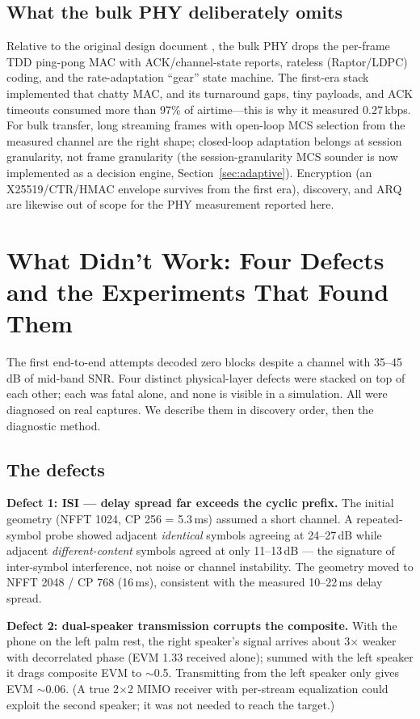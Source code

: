 \documentclass[11pt]{article}
\begin{document}
\subsection{What the bulk PHY deliberately omits}

Relative to the original design document \cite{prd}, the bulk PHY drops the
per-frame TDD ping-pong MAC with ACK/channel-state reports, rateless
(Raptor/LDPC) coding, and the rate-adaptation ``gear'' state machine. The
first-era stack implemented that chatty MAC, and its turnaround gaps, tiny
payloads, and ACK timeouts consumed more than 97\% of airtime---this is why it
measured 0.27\,kbps. For bulk transfer, long streaming frames with open-loop
MCS selection from the measured channel are the right shape; closed-loop
adaptation belongs at session granularity, not frame granularity (the
session-granularity MCS sounder is now implemented as a decision engine,
Section~\ref{sec:adaptive}). Encryption
(an X25519/CTR/HMAC envelope survives from the first era), discovery, and
ARQ are likewise out of scope for the PHY measurement reported here.

\section{What Didn't Work: Four Defects and the Experiments That Found Them}
\label{sec:defects}

The first end-to-end attempts decoded zero blocks despite a channel with
35--45\,dB of mid-band SNR. Four distinct physical-layer defects were stacked
on top of each other; each was fatal alone, and none is visible in a
simulation. All were diagnosed on real captures. We describe them in
discovery order, then the diagnostic method.

\subsection{The defects}

\textbf{Defect 1: ISI --- delay spread far exceeds the cyclic prefix.}
The initial geometry (NFFT 1024, CP 256 = 5.3\,ms) assumed a short channel.
A repeated-symbol probe showed adjacent \emph{identical} symbols agreeing at
24--27\,dB while adjacent \emph{different-content} symbols agreed at only
11--13\,dB --- the signature of inter-symbol interference, not noise or
channel instability. The geometry moved to NFFT 2048 / CP 768 (16\,ms),
consistent with the measured 10--22\,ms delay spread.

\textbf{Defect 2: dual-speaker transmission corrupts the composite.}
With the phone on the left palm rest, the right speaker's signal arrives about
3$\times$ weaker with decorrelated phase (EVM 1.33 received alone); summed
with the left speaker it drags composite EVM to $\sim$0.5. Transmitting from
the left speaker only gives EVM $\sim$0.06. (A true 2$\times$2 MIMO receiver
with per-stream equalization could exploit the second speaker; it was not
needed to reach the target.)
\end{document}
